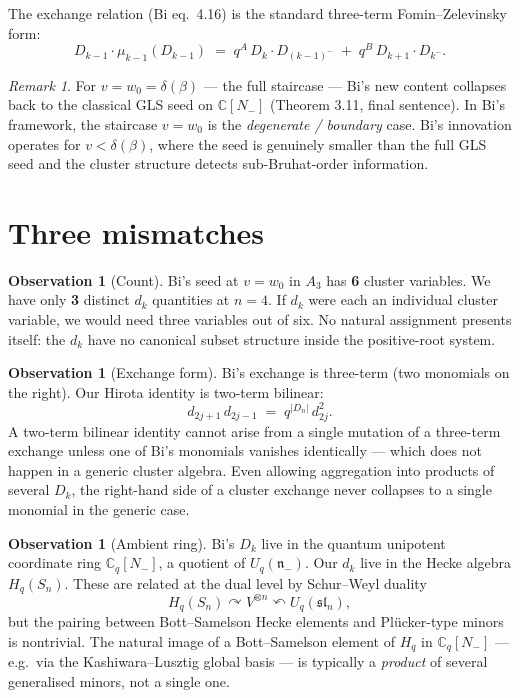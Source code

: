 \documentclass{article}
\theoremstyle{definition}
\newtheorem{observation}[theorem]{Observation}
\theoremstyle{remark}
\newtheorem{remark}[theorem]{Remark}
\begin{document}
The exchange relation (Bi eq.~4.16) is the standard three-term Fomin--Zelevinsky form:
$$D_{k-1} \cdot \mu_{k-1}(D_{k-1}) \;=\; q^A \, D_k \cdot D_{(k-1)^-} \;+\; q^B \, D_{k+1} \cdot D_{k^-}.$$

\begin{remark}
For $v = w_0 = \delta(\beta)$ --- the full staircase --- Bi's new content collapses back to the classical GLS seed on $\mathbb{C}[N_-]$ (Theorem 3.11, final sentence). In Bi's framework, the staircase $v = w_0$ is the \emph{degenerate / boundary} case. Bi's innovation operates for $v < \delta(\beta)$, where the seed is genuinely smaller than the full GLS seed and the cluster structure detects sub-Bruhat-order information.
\end{remark}

\section{Three mismatches}

\begin{observation}[Count]
Bi's seed at $v = w_0$ in $A_3$ has \textbf{6} cluster variables. We have only \textbf{3} distinct $d_k$ quantities at $n=4$. If $d_k$ were each an individual cluster variable, we would need three variables out of six. No natural assignment presents itself: the $d_k$ have no canonical subset structure inside the positive-root system.
\end{observation}

\begin{observation}[Exchange form]
Bi's exchange is three-term (two monomials on the right). Our Hirota identity is two-term bilinear:
$$d_{2j+1} \, d_{2j-1} \;=\; q^{|D_n|} \, d_{2j}^2.$$
A two-term bilinear identity cannot arise from a single mutation of a three-term exchange unless one of Bi's monomials vanishes identically --- which does not happen in a generic cluster algebra. Even allowing aggregation into products of several $D_k$, the right-hand side of a cluster exchange never collapses to a single monomial in the generic case.
\end{observation}

\begin{observation}[Ambient ring]
Bi's $D_k$ live in the quantum unipotent coordinate ring $\mathbb{C}_q[N_-]$, a quotient of $U_q(\mathfrak{n}_-)$. Our $d_k$ live in the Hecke algebra $H_q(S_n)$. These are related at the dual level by Schur--Weyl duality
$$H_q(S_n) \curvearrowright V^{\otimes n} \curvearrowleft U_q(\mathfrak{sl}_n),$$
but the pairing between Bott--Samelson Hecke elements and Pl\"ucker-type minors is nontrivial. The natural image of a Bott--Samelson element of $H_q$ in $\mathbb{C}_q[N_-]$ --- e.g.\ via the Kashiwara--Lusztig global basis --- is typically a \emph{product} of several generalised minors, not a single one.
\end{observation}
\end{document}
